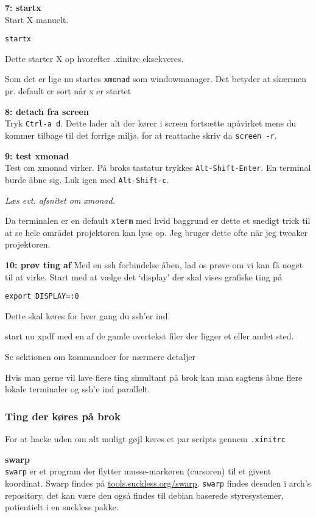 \documentclass[10pt,a4paper,danish]{article}
\newcommand{\code}[1]{\colorbox{verbgray}{\texttt{#1}}}
\begin{document}
\textbf{7: startx}\\
Start X manuelt.
\begin{verbatim}
startx
\end{verbatim}
Dette starter X op hvorefter .xinitrc eksekveres.

Som det er lige nu startes \texttt{xmonad} som windowmanager.
Det betyder at skærmen pr. default er sort når x er startet


\textbf{8: detach fra screen}\\
Tryk \texttt{Ctrl-a d}. Dette lader alt der kører i screen fortsætte upåvirket
mens du kommer tilbage til det forrige miljø.
for at reattache skriv da \code{screen -r}.

\textbf{9: test xmonad}\\
Test om xmonad virker. På broks tastatur trykkes \texttt{Alt-Shift-Enter}.
En terminal burde åbne sig.
Luk igen med \texttt{Alt-Shift-c}.

\textit{Læs evt. afsnitet om xmonad.}

Da terminalen er en default \texttt{xterm} med hvid baggrund er dette et snedigt trick
til at se hele området projektoren kan lyse op.
Jeg bruger dette ofte når jeg tweaker projektoren.



\textbf{10: prøv ting af}
Med en ssh forbindelse åben, lad os prøve om vi kan få noget til at virke.
Start med at vælge det `display' der skal vises grafiske ting på
\begin{verbatim}
export DISPLAY=:0
\end{verbatim}
Dette skal køres for hver gang du ssh'er ind.

start nu xpdf med en af de gamle overtekst filer der ligger et eller andet sted.

Se sektionen om kommandoer for nærmere detaljer

Hvis man gerne vil lave flere ting simultant på brok kan man sagtens åbne flere
lokale terminaler og ssh'e ind parallelt.




\subsubsection{Ting der køres på brok}
For at hacke uden om alt muligt gøjl køres et par scripts gennem
\texttt{.xinitrc}

\textbf{swarp}\\
\texttt{swarp} er et program der flytter musse-markøren (cursoren) til et givent koordinat.
Swarp findes på \url{tools.suckless.org/swarp}.
\texttt{swarp} findes desuden i arch's repository, det kan være den også findes til
debian baserede styresystemer, potientielt i en suckless pakke.
\end{document}
